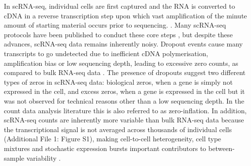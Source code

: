\documentclass{bmcart}
\begin{document}
In scRNA-seq, individual cells are first captured and the RNA is converted to cDNA in a reverse transcription step upon which vast amplification of the minute amount of starting material occurs prior to sequencing. \cite{Kolodziejczyk2015a}.
Many scRNA-seq protocols have been published to conduct these core steps \cite{Nakamura2015, Wu2013a, Islam2013, Islam2011, Picelli2014, Hashimshony2016a}, but despite these advances, scRNA-seq data remains inherently noisy.
Dropout events cause many transcripts to go undetected due to inefficient cDNA polymerisation, amplification bias or low sequencing depth, leading to excessive zero counts, as compared to bulk RNA-seq data \cite{Hashimshony2016a, Finak2015}.
The presence of dropouts suggest two different types of zeros in scRNA-seq data: biological zeros, when a gene is simply not expressed in the cell, and excess zeros, when a gene is expressed in the cell but it was not observed for technical reasons other than a low sequencing depth. 
In the count data analysis literature this is also referred to as zero-inflation.
In addition, scRNA-seq counts are inherently more variable than bulk RNA-seq data because the transcriptional signal is not averaged across thousands of individual cells (Additional File 1: Figure S1), making cell-to-cell heterogeneity, cell type mixtures and stochastic expression bursts important contributors to between-sample variability \cite{Raj2006, Buettner2015}.
\end{document}

